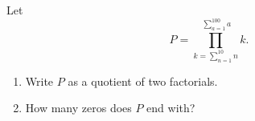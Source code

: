 Let
\[
P=\prod_{k=\sum_{n=1}^{10} n}^{\ \sum_{a=1}^{100} a} k .
\]
\begin{enumerate}
\item[(a)] Write $P$ as a quotient of two factorials.
\item[(b)] How many zeros does $P$ end with?
\end{enumerate}
